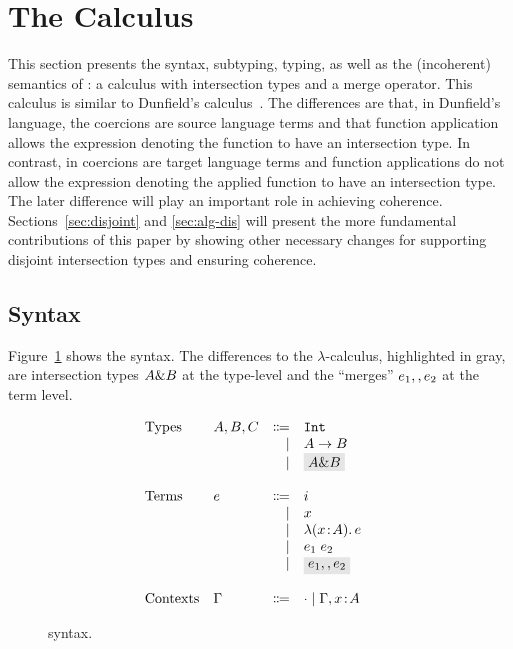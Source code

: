 \section{The \name Calculus}
\label{sec:fi}

This section presents the syntax, subtyping, typing, as well as the (incoherent)
semantics of \name: a calculus with intersection types and a merge operator.
This calculus is similar to Dunfield's calculus~\cite{dunfield2014elaborating}.
The differences are that, in Dunfield's language, the coercions are source
language terms and that function application allows the expression denoting the
function to have an intersection type. In contrast, in \name coercions are
target language terms and function applications do not allow the expression
denoting the applied function to have an intersection type. The later
difference will play an important role in achieving coherence.
Sections~\ref{sec:disjoint} and \ref{sec:alg-dis} will present the more fundamental contributions of this
paper by showing other necessary changes for supporting
disjoint intersection types and ensuring coherence.

\subsection{Syntax}

Figure~\ref{fig:fi-syntax} shows the syntax. The differences to the
$\lambda$-calculus, highlighted in gray, are intersection types $A \& B$ at
the type-level and the ``merges'' $e_1 ,, e_2$ at the term level.

\begin{figure}[t]
  \[
    \begin{array}{l}
      \begin{array}{llrll}
        \text{Types}
        & A, B, C & \Coloneqq & \code{Int} & \\
        &         & \mid      & A \to B    & \\
        &         & \mid      & \highlight{$A \inter B$}  & \\

        \\
        \text{Terms}
        & e & \Coloneqq & i            & \\
        &   & \mid & x                 & \\
        &   & \mid & \lamty x A e      & \\
        &   & \mid & \app {e_1} {e_2}  & \\
        &   & \mid & \highlight{$e_1 \mergeop e_2$}  & \\

        \\
        \text{Contexts}
        & \Gamma & \Coloneqq & \cdot
                   \mid \Gamma, x \oftype A  & \\
      \end{array}
    \end{array}
  \]

  \caption{\name syntax.}
  \label{fig:fi-syntax}
\end{figure}

